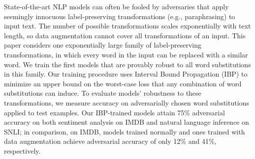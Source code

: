 State-of-the-art NLP models can often be fooled by adversaries that apply seemingly innocuous label-preserving transformations (e.g., paraphrasing) to input text. The number of possible transformations scales exponentially with text length, so data augmentation cannot cover all transformations of an input. This paper considers one exponentially large family of label-preserving transformations, in which every word in the input can be replaced with a similar word. We train the first models that are provably robust to all word substitutions in this family. Our training procedure uses Interval Bound Propagation (IBP) to minimize an upper bound on the worst-case loss that any combination of word substitutions can induce. To evaluate models' robustness to these transformations, we measure accuracy on adversarially chosen word substitutions applied to test examples. Our IBP-trained models attain 75\% adversarial accuracy on both  sentiment analysis on IMDB and natural language inference on SNLI; in comparison, on IMDB, models trained normally and ones trained with data augmentation achieve adversarial accuracy of only 12\% and 41\%, respectively.